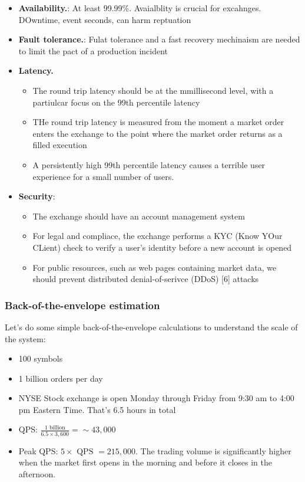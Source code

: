 \documentclass{report}
\theoremstyle{definition}
\let\oldsubsubsection\subsubsection
\renewcommand{\subsubsection}{\oldsubsubsection*}
\begin{document}
\begin{itemize}
\item
\textbf{Availability.}: At least 99.99\%. Avaialblity is crucial for excahnges. DOwntime, event seconds, can harm reptuation
\item
\textbf{Fault tolerance.}: Fulat tolerance and a fast recovery mechinaism are needed to limit the pact of a production incident
\item
\textbf{Latency.}

\begin{itemize}
\item
The round trip latency should be at the mmillisecond level, with a partiulcar focus on the 99th percentile latency
\item
THe round trip latency is measured from the moment a market order enters the exchange to the point where the market order returns as a filled execution
\item
A persistently high 99th percentile latency causes a terrible user experience for a small number of users.
\end{itemize}

\item
\textbf{Security}:
\begin{itemize}
\item
The exchange should have an account management system
\item
For legal and compliace, the exchange performs a KYC (Know YOur CLient) check to verify a user's identity  before a new account is opened
\item
For public resources, such as web pages containing market data, we should prevent distributed denial-of-serivce (DDoS) [6] attacks
\end{itemize}
\end{itemize}

\subsubsection{Back-of-the-envelope estimation}

Let's do some simple back-of-the-envelope calculations to understand the scale of the system:

\begin{itemize}
\item
100 symbols
\item
1 billion orders per day
\item
NYSE Stock exchange is open Monday through Friday from 9:30 am to 4:00 pm Eastern Time. That's 6.5 hours in total
\item
QPS: $\frac{1 \text{ billion}}{6.5 \times 3,600} = \sim 43,000$
\item
Peak QPS: $5 \times \text{ QPS } = 215,000$. The trading volume is significantly higher when the market first opens in the morning and before it closes in the afternoon.
\end{itemize}
\end{document}
